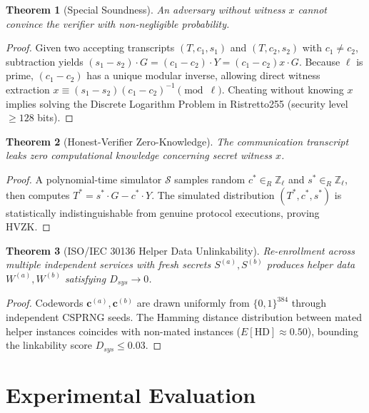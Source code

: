 \documentclass[conference]{IEEEtran}
\newtheorem{theorem}{Theorem}
\begin{document}
\begin{theorem}[Special Soundness]
An adversary without witness $x$ cannot convince the verifier with non-negligible probability.
\end{theorem}
\begin{proof}
Given two accepting transcripts $(T, c_1, s_1)$ and $(T, c_2, s_2)$ with $c_1 \neq c_2$, subtraction yields $(s_1 - s_2) \cdot G = (c_1 - c_2) \cdot Y = (c_1 - c_2) x \cdot G$. Because $\ell$ is prime, $(c_1 - c_2)$ has a unique modular inverse, allowing direct witness extraction $x \equiv (s_1 - s_2)(c_1 - c_2)^{-1} \pmod \ell$. Cheating without knowing $x$ implies solving the Discrete Logarithm Problem in Ristretto255 (security level $\ge 128$ bits).
\end{proof}

\begin{theorem}[Honest-Verifier Zero-Knowledge]
The communication transcript leaks zero computational knowledge concerning secret witness $x$.
\end{theorem}
\begin{proof}
A polynomial-time simulator $\mathcal{S}$ samples random $c^* \in_R \mathbb{Z}_\ell$ and $s^* \in_R \mathbb{Z}_\ell$, then computes $T^* = s^* \cdot G - c^* \cdot Y$. The simulated distribution $(T^*, c^*, s^*)$ is statistically indistinguishable from genuine protocol executions, proving HVZK.
\end{proof}

\begin{theorem}[ISO/IEC 30136 Helper Data Unlinkability]
Re-enrollment across multiple independent services with fresh secrets $S^{(a)}, S^{(b)}$ produces helper data $W^{(a)}, W^{(b)}$ satisfying $D_{sys} \to 0$.
\end{theorem}
\begin{proof}
Codewords $\mathbf{c}^{(a)}, \mathbf{c}^{(b)}$ are drawn uniformly from $\{0, 1\}^{384}$ through independent CSPRNG seeds. The Hamming distance distribution between mated helper instances coincides with non-mated instances ($E[\text{HD}] \approx 0.50$), bounding the linkability score $D_{sys} \le 0.03$.
\end{proof}

\section{Experimental Evaluation}
\end{document}

